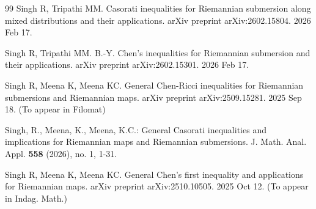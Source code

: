 \documentclass[10pt,a4paper]{article}
\theoremstyle{definition}
\theoremstyle{remark}
\numberwithin{equation}{section}
\begin{document}
\begin{thebibliography}{99}
 Singh R, Tripathi MM. Casorati inequalities for Riemannian submersion along mixed distributions and their applications. arXiv preprint arXiv:2602.15804. 2026 Feb 17.

 Singh R, Tripathi MM. B.-Y. Chen's inequalities for Riemannian submersion and their applications. arXiv preprint arXiv:2602.15301. 2026 Feb 17.

 Singh R, Meena K, Meena KC. General Chen-Ricci inequalities for Riemannian submersions and Riemannian maps. arXiv preprint arXiv:2509.15281. 2025 Sep 18. (To appear in Filomat)

 Singh, R., Meena, K., Meena, K.C.:
General Casorati inequalities and implications for Riemannian maps and
Riemannian submersions. J. Math. Anal. Appl. {\bf 558} (2026), no. 1, 1-31.

 Singh R, Meena K, Meena KC. General Chen's first inequality and applications for Riemannian maps. arXiv preprint arXiv:2510.10505. 2025 Oct 12. (To appear in Indag. Math.)



\end{thebibliography}
\end{document}
